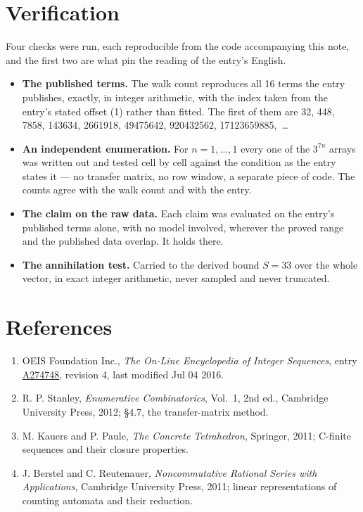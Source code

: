 \documentclass[11pt]{article}
\theoremstyle{definition}
\begin{document}
\section{Verification}

Four checks were run, each reproducible from the code accompanying this note, and the first two are what pin the reading of the entry's English.

\begin{itemize}

\item {\bfseries The published terms.} The walk count reproduces all 16 terms the entry publishes, exactly, in integer arithmetic, with the index taken from the entry's stated offset (1) rather than fitted. The first of them are 32, 448, 7858, 143634, 2661918, 49475642, 920432562, 17123659885,~\dots

\item {\bfseries An independent enumeration.} For $n = 1,\dots,1$ every one of the $3^{7n}$ arrays was written out and tested cell by cell against the condition as the entry states it --- no transfer matrix, no row window, a separate piece of code. The counts agree with the walk count and with the entry.

\item {\bfseries The claim on the raw data.} Each claim was evaluated on the entry's published terms alone, with no model involved, wherever the proved range and the published data overlap. It holds there.

\item {\bfseries The annihilation test.} Carried to the derived bound $S = 33$ over the whole vector, in exact integer arithmetic, never sampled and never truncated.

\end{itemize}

\section{References}

\begin{enumerate}

\item OEIS Foundation Inc., \emph{The On-Line Encyclopedia of Integer Sequences}, entry \href{https://oeis.org/A274748}{A274748}, revision 4, last modified Jul 04 2016.

\item R. P. Stanley, \emph{Enumerative Combinatorics}, Vol.~1, 2nd ed., Cambridge University Press, 2012; \S4.7, the transfer-matrix method.

\item M. Kauers and P. Paule, \emph{The Concrete Tetrahedron}, Springer, 2011; C-finite sequences and their closure properties.

\item J. Berstel and C. Reutenauer, \emph{Noncommutative Rational Series with Applications}, Cambridge University Press, 2011; linear representations of counting automata and their reduction.

\end{enumerate}
\end{document}
